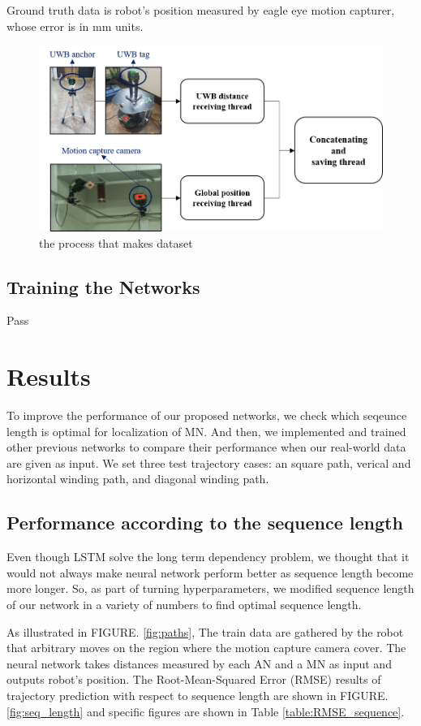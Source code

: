 \documentclass{ieeeaccess}
\begin{document}
Ground truth data is robot's position measured by eagle eye motion capturer, whose error is in mm units.
\begin{figure}[h!]
	\centering
	\includegraphics[width=0.9\linewidth]{dataset_process}
	\caption{the process that makes dataset}
	\label{fig:dataset} 	
\end{figure}

\subsection{Training the Networks}

Pass

\section{Results}

To improve the performance of our proposed networks, we check which seqeunce length is optimal for localization of MN. And then, we implemented and trained other previous networks to compare their performance when our real-world data are given as input. We set three test trajectory cases: an square path, verical and horizontal winding path, and diagonal winding path. 

\subsection{Performance according to the sequence length}

Even though LSTM solve the long term dependency problem, we thought that it would not always make neural network perform better as sequence length become more longer. So, as part of turning hyperparameters, we modified sequence length of our network in a variety of numbers to find optimal sequence length.   

As illustrated in FIGURE. \ref{fig:paths}, The train data are gathered by the robot that arbitrary moves on the region where the motion capture camera cover. The neural network takes distances measured by each AN and a MN as input and outputs robot's position. The Root-Mean-Squared Error (RMSE) results of trajectory prediction with respect to sequence length are shown in FIGURE. \ref{fig:seq_length} and specific figures are shown in Table \ref{table:RMSE_sequence}.
\end{document}
